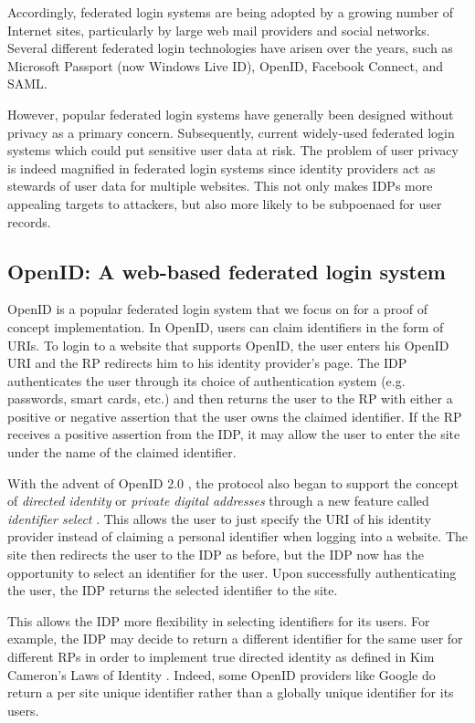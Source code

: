 \documentclass{llncs}
\begin{document}
Accordingly, federated login systems are being adopted by a growing
number of Internet sites, particularly by large web mail providers and
social networks.  Several different federated login technologies have
arisen over the years, such as Microsoft Passport (now Windows Live
ID), OpenID, Facebook Connect, and SAML.

However, popular federated login systems have generally been designed
without privacy as a primary concern. Subsequently, current
widely-used federated login systems which could put sensitive user
data at risk. The problem of user privacy is indeed magnified in
federated login systems since identity providers act as stewards of
user data for multiple websites. This not only makes IDPs more
appealing targets to attackers, but also more likely to be subpoenaed
for user records.

\subsection{OpenID: A web-based federated login system}

OpenID is a popular federated login system that we focus on for a
proof of concept implementation. In OpenID, users can claim
identifiers in the form of URIs. To login to a website that supports
OpenID, the user enters his OpenID URI and the RP redirects him to
his identity provider's page. The IDP authenticates the user through
its choice of authentication system (e.g. passwords, smart cards,
etc.) and then returns the user to the RP with either a positive or
negative assertion that the user owns the claimed identifier. If the
RP receives a positive assertion from the IDP, it may allow the user
to enter the site under the name of the claimed identifier.

With the advent of OpenID 2.0 \cite{OID2}, the protocol also began to
support the concept of \emph{directed identity} \cite{Cam06} or
\emph{private digital addresses} through a new feature called
\emph{identifier select} \cite{RR06}.  This allows the user to just
specify the URI of his identity provider instead of claiming a
personal identifier when logging into a website. The site then
redirects the user to the IDP as before, but the IDP now has the
opportunity to select an identifier for the user. Upon successfully
authenticating the user, the IDP returns the selected identifier to
the site.

This allows the IDP more flexibility in selecting identifiers for its
users. For example, the IDP may decide to return a different
identifier for the same user for different RPs in order to implement
true directed identity as defined in Kim Cameron's Laws of Identity
\cite{Cam06}. Indeed, some OpenID providers like Google do return a
per site unique identifier rather than a globally unique identifier
for its users.
\end{document}

